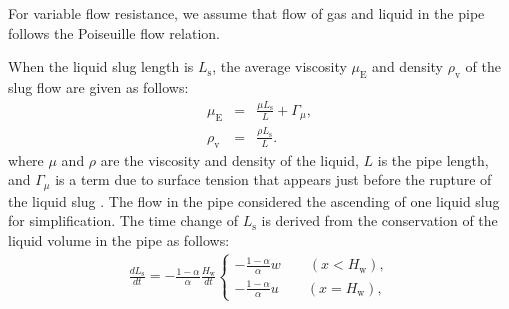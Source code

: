 \documentclass[aps,pre,preprint,groupedaddress,showkeys]{revtex4-2}
\begin{document}
For variable flow resistance, we assume that flow of gas and liquid in the pipe follows the Poiseuille flow relation. 

When the liquid slug length is $L_ \mathrm{s}$, the average viscosity $\mu_\mathrm{E}$ and density $\rho_\mathrm{v}$ of the slug flow are given as follows:
\begin{eqnarray}
\mu_\mathrm{E} &=& \frac{\mu L_\mathrm{s}}{L} + \Gamma_\mu \label{mue},\\
\rho_\mathrm{v} &=& \frac{\rho L_\mathrm{s}}{L}. \label{rhov}
\end{eqnarray}
where $\mu$ and $\rho$ are the viscosity and density of the liquid, $L$ is the pipe length, and $\Gamma_ \mu$ is a term due to surface tension that appears just before the rupture of the liquid slug \citep{kanno2018}.
The flow in the pipe considered the ascending of one liquid slug for simplification.
The time change of $L_\mathrm{s}$ is derived from the conservation of the liquid volume in the pipe as follows:
\begin{eqnarray}
\frac{dL_\mathrm{s}}{dt}= - \frac{1-\alpha}{\alpha} \frac{H_\mathrm{w}}{dt} \left\{
  \begin{array}{ll}
  -\frac{1-\alpha}{\alpha} w \qquad (x<H_\mathrm{w}), \\
   -\frac{1-\alpha}{\alpha} u \qquad (x=H_\mathrm{w}),
  \end{array}
  \right. 
  \label{dLdt}
\end{eqnarray}
\end{document}
